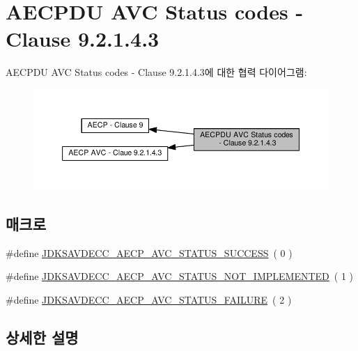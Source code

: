 \hypertarget{group___a_e_c_p__avc__status}{}\section{A\+E\+C\+P\+DU A\+VC Status codes -\/ Clause 9.2.1.4.3}
\label{group___a_e_c_p__avc__status}
A\+E\+C\+P\+DU A\+VC Status codes -\/ Clause 9.2.1.4.3에 대한 협력 다이어그램\+:
\nopagebreak
\begin{figure}[H]
\begin{center}
\leavevmode
\includegraphics[width=350pt]{group___a_e_c_p__avc__status}
\end{center}
\end{figure}
\subsection*{매크로}
\begin{DoxyCompactItemize}
\item 
\#define \hyperlink{group___a_e_c_p__avc__status_ga7c1351262bacfda51e70ae01c97ab5a0}{J\+D\+K\+S\+A\+V\+D\+E\+C\+C\+\_\+\+A\+E\+C\+P\+\_\+\+A\+V\+C\+\_\+\+S\+T\+A\+T\+U\+S\+\_\+\+S\+U\+C\+C\+E\+SS}~( 0 )
\item 
\#define \hyperlink{group___a_e_c_p__avc__status_gafc323c427b582c47432f3dbf5bd446ed}{J\+D\+K\+S\+A\+V\+D\+E\+C\+C\+\_\+\+A\+E\+C\+P\+\_\+\+A\+V\+C\+\_\+\+S\+T\+A\+T\+U\+S\+\_\+\+N\+O\+T\+\_\+\+I\+M\+P\+L\+E\+M\+E\+N\+T\+ED}~( 1 )
\item 
\#define \hyperlink{group___a_e_c_p__avc__status_ga6c458f6092ac0f495182d5380c13fe5f}{J\+D\+K\+S\+A\+V\+D\+E\+C\+C\+\_\+\+A\+E\+C\+P\+\_\+\+A\+V\+C\+\_\+\+S\+T\+A\+T\+U\+S\+\_\+\+F\+A\+I\+L\+U\+RE}~( 2 )
\end{DoxyCompactItemize}


\subsection{상세한 설명}


